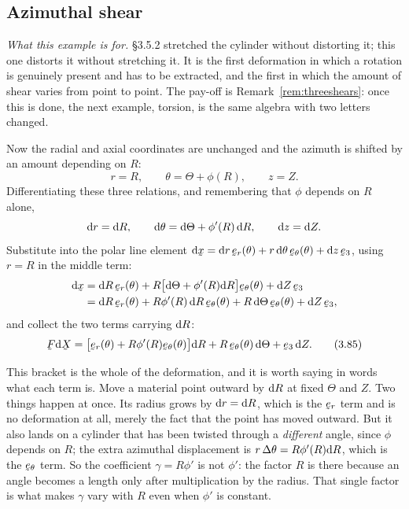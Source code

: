 \subsection{Azimuthal shear}\label{sec:azim}

\emph{What this example is for.} \S3.5.2 stretched the cylinder without
distorting it; this one distorts it without stretching it. It is the first
deformation in which a rotation is genuinely present and has to be
extracted, and the first in which the amount of shear varies from point to
point. The pay-off is Remark~\ref{rem:threeshears}: once this is done, the
next example, torsion, is the same algebra with two letters changed.

Now the radial and axial coordinates are unchanged and the azimuth is
shifted by an amount depending on $R$:
\begin{equation}
   r=R,\qquad \theta=\Theta+\phi(R),\qquad z=Z .
   \tag{3.84}\label{eq:3.84}
\end{equation}
Differentiating these three relations, and remembering that $\phi$ depends
on $R$ alone,
\[
   \mathrm{d} r=\mathrm{d} R,\qquad
   \mathrm{d}\theta=\mathrm{d}\Theta+\phi'(R)\,\mathrm{d} R,\qquad
   \mathrm{d} z=\mathrm{d} Z .
\]
Substitute into the polar line element
$\dl\bx=\dl r\,\ber(\theta)+r\,\dl\theta\,\bet(\theta)+\dl z\,\be_{3}$,
using $r=R$ in the middle term:
\[
\begin{aligned}
   \dl\bx&=\dl R\,\ber(\theta)
      +R\big[\dl\Theta+\phi'(R)\dl R\big]\bet(\theta)+\dl Z\,\be_{3}\\
   &=\dl R\,\ber(\theta)+R\phi'(R)\,\dl R\,\bet(\theta)
      +R\,\dl\Theta\,\bet(\theta)+\dl Z\,\be_{3},
\end{aligned}
\]
and collect the two terms carrying $\mathrm{d} R$:
\begin{equation}
   \bF\dl\bX=\big[\ber(\theta)+R\phi'(R)\bet(\theta)\big]\dl R
             +R\,\bet(\theta)\,\dl\Theta+\be_{3}\,\dl Z .
   \tag{3.85}\label{eq:3.85}
\end{equation}

\begin{remark}
\label{rem:twoterms}
This bracket is the whole of the deformation, and it is worth saying in
words what each term is. Move a material point outward by $\mathrm{d} R$ at fixed
$\Theta$ and $Z$. Two things happen at once. Its radius grows by
$\mathrm{d} r=\mathrm{d} R$, which is the $\ber$ term and is no deformation at all,
merely the fact that the point has moved outward. But it also lands on a
cylinder that has been twisted through a \emph{different} angle, since
$\phi$ depends on $R$; the extra azimuthal displacement is
$r\,\Delta\theta=R\phi'(R)\mathrm{d} R$, which is the $\bet$ term. So the
coefficient $\gamma=R\phi'$ is not $\phi'$: the factor $R$ is there
because an angle becomes a length only after multiplication by the radius.
That single factor is what makes $\gamma$ vary with $R$ even when
$\phi'$ is constant.
\end{remark}

